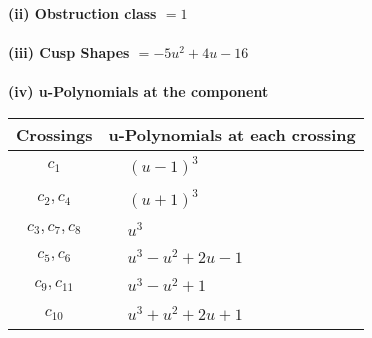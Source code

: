 \documentclass[1p]{elsarticle_modified}
\theoremstyle{definition}
\begin{document}
\flushleft \textbf{(ii) Obstruction class $= 1$}\\~\\
\flushleft \textbf{(iii) Cusp Shapes $= -5 u^2+4 u-16$}\\~\\
\newpage\renewcommand{\arraystretch}{1}
\flushleft \textbf{(iv) u-Polynomials at the component}\newline \\
\begin{tabular}{m{50pt}|m{274pt}}
Crossings & \hspace{64pt}u-Polynomials at each crossing \\
\hline $$\begin{aligned}c_{1}\end{aligned}$$&$\begin{aligned}
&(u-1)^3
\end{aligned}$\\
\hline $$\begin{aligned}c_{2},c_{4}\end{aligned}$$&$\begin{aligned}
&(u+1)^3
\end{aligned}$\\
\hline $$\begin{aligned}c_{3},c_{7},c_{8}\end{aligned}$$&$\begin{aligned}
&u^3
\end{aligned}$\\
\hline $$\begin{aligned}c_{5},c_{6}\end{aligned}$$&$\begin{aligned}
&u^3- u^2+2 u-1
\end{aligned}$\\
\hline $$\begin{aligned}c_{9},c_{11}\end{aligned}$$&$\begin{aligned}
&u^3- u^2+1
\end{aligned}$\\
\hline $$\begin{aligned}c_{10}\end{aligned}$$&$\begin{aligned}
&u^3+u^2+2 u+1
\end{aligned}$\\
\hline
\end{tabular}\\~\\
\newpage\renewcommand{\arraystretch}{1}
\end{document}
